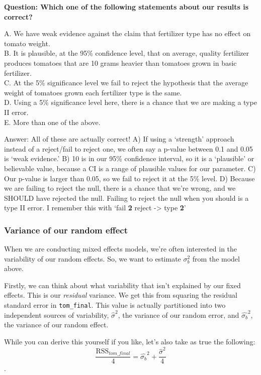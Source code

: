 \documentclass[
  openany]{book}
\begin{document}
\textbf{Question: Which one of the following statements about our results is correct?}

A. We have weak evidence against the claim that fertilizer type has no effect on tomato weight.\\
B. It is plausible, at the 95\% confidence level, that on average, quality fertilizer produces tomatoes that are 10 grams heavier than tomatoes grown in basic fertilizer.\\
C. At the 5\% significance level we fail to reject the hypothesis that the average weight of tomatoes grown each fertilizer type is the same.\\
D. Using a 5\% significance level here, there is a chance that we are making a type II error.\\
E. More than one of the above.

Answer: All of these are actually correct! A) If using a `strength' approach instead of a reject/fail to reject one, we often say a p-value between 0.1 and 0.05 is `weak evidence.' B) 10 is in our 95\% confidence interval, so it is a `plausible' or believable value, because a CI is a range of plausible values for our parameter. C) Our p-value is larger than 0.05, so we fail to reject it at the 5\% level. D) Because we are failing to reject the null, there is a chance that we're wrong, and we SHOULD have rejected the null. Failing to reject the null when you should is a type II error. I remember this with `fail \textbf{2} reject -\textgreater{} type \textbf{2}'

\hypertarget{variance-of-our-random-effect}{%
\subsubsection{Variance of our random effect}\label{variance-of-our-random-effect}}

When we are conducting mixed effects models, we're often interested in the variability of our random effects. So, we want to estimate \(\sigma_b^2\) from the model above.

Firstly, we can think about what variability that isn't explained by our fixed effects. This is our \emph{residual} variance. We get this from squaring the residual standard error in \texttt{tom\_final}. This value is actually partitioned into two independent sources of variability, \(\hat{\sigma}^2\), the variance of our random error, and \(\hat{\sigma_b}^2\), the variance of our random effect.

While you can derive this yourself if you like, let's also take as true the following:
\[\frac{\text{RSS}_{tom\_final}}{4} = \hat{\sigma_b}^2 + \frac{\hat{\sigma}^2}{4} \].
\end{document}
